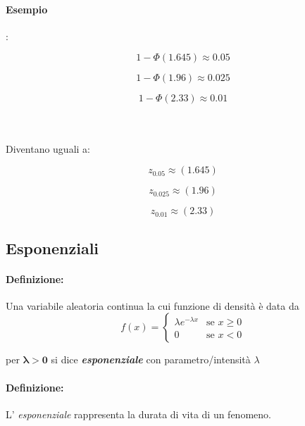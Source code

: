 \documentclass[]{article}
\newcommand{\definizione}{\paragraph{Definizione:}}
\begin{document}
    \paragraph{Esempio}: \\
    \begin{minipage}{0.3\textwidth}
        \[ 1 - \Phi(1.645) \approx 0.05 \]
    \end{minipage}
    \begin{minipage}{0.3\textwidth}
        \[ 1 - \Phi(1.96) \approx 0.025 \]
    \end{minipage}
    \begin{minipage}{0.3\textwidth}
        \[ 1 - \Phi(2.33) \approx 0.01 \]
    \end{minipage} \\ \\
    Diventano uguali a: \\
    \begin{minipage}{0.3\textwidth}
        \[ z_{0.05} \approx (1.645) \]
    \end{minipage}
    \begin{minipage}{0.3\textwidth}
        \[ z_{0.025} \approx (1.96) \]
    \end{minipage}
    \begin{minipage}{0.3\textwidth}
        \[ z_{0.01} \approx (2.33) \]
    \end{minipage}

    \subsection{Esponenziali}
    \definizione Una variabile aleatoria continua la cui funzione di densità è data da 
    \begin{equation*}
        f(x) =
        \begin{cases}
            \lambda e^{-\lambda x} & \text{se } x \geq 0 \\
            0 & \text{se } x < 0
        \end{cases}
    \end{equation*}
    \centerline{per $\boldsymbol{\lambda > 0}$ si dice \textbf{\textit{esponenziale}} con parametro/intensità $\lambda$}
    \definizione L' \textit{esponenziale} rappresenta la durata di vita di un fenomeno.
\end{document}
